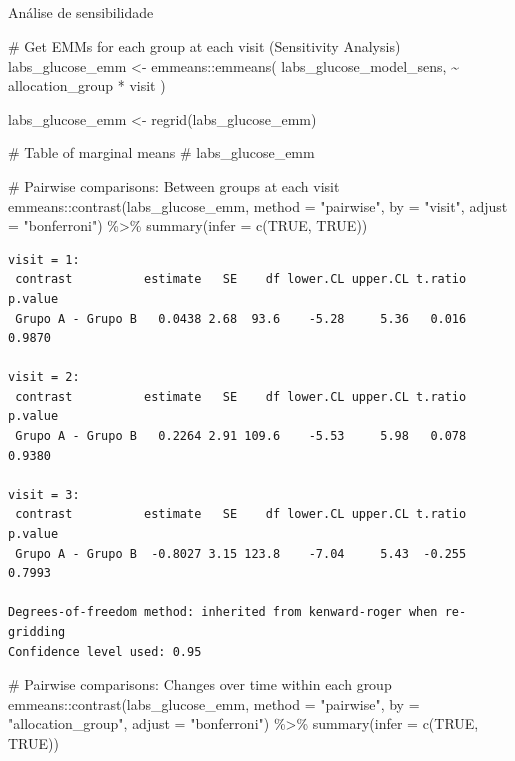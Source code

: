 \documentclass[
  12pt,
]{article}
\makeatletter
\let\oldsubparagraph\subparagraph
\renewcommand{\subparagraph}{
    \@ifstar
      \xxxSubParagraphStar
      \xxxSubParagraphNoStar
  }
\newcommand{\xxxSubParagraphStar}[1]{\oldsubparagraph*{#1}\mbox{}}
\newcommand{\xxxSubParagraphNoStar}[1]{\oldsubparagraph{#1}\mbox{}}
\newenvironment{Shaded}{\begin{snugshade}}{\end{snugshade}}
\newcommand{\AttributeTok}[1]{\textcolor[rgb]{0.40,0.45,0.13}{#1}}
\newcommand{\CommentTok}[1]{\textcolor[rgb]{0.37,0.37,0.37}{#1}}
\newcommand{\ConstantTok}[1]{\textcolor[rgb]{0.56,0.35,0.01}{#1}}
\newcommand{\FunctionTok}[1]{\textcolor[rgb]{0.28,0.35,0.67}{#1}}
\newcommand{\NormalTok}[1]{\textcolor[rgb]{0.00,0.23,0.31}{#1}}
\newcommand{\OtherTok}[1]{\textcolor[rgb]{0.00,0.23,0.31}{#1}}
\newcommand{\SpecialCharTok}[1]{\textcolor[rgb]{0.37,0.37,0.37}{#1}}
\newcommand{\StringTok}[1]{\textcolor[rgb]{0.13,0.47,0.30}{#1}}
\makeatother
\begin{document}
\subparagraph{Análise de
sensibilidade}\label{anuxe1lise-de-sensibilidade-8}

\begin{Shaded}
\begin{Highlighting}[]
\CommentTok{\# Get EMMs for each group at each visit (Sensitivity Analysis)}
\NormalTok{labs\_glucose\_emm }\OtherTok{\textless{}{-}}\NormalTok{ emmeans}\SpecialCharTok{::}\FunctionTok{emmeans}\NormalTok{(}
\NormalTok{    labs\_glucose\_model\_sens, }
    \SpecialCharTok{\textasciitilde{}}\NormalTok{ allocation\_group }\SpecialCharTok{*}\NormalTok{ visit}
\NormalTok{)}

\NormalTok{labs\_glucose\_emm }\OtherTok{\textless{}{-}} \FunctionTok{regrid}\NormalTok{(labs\_glucose\_emm)}

\CommentTok{\# Table of marginal means}
\CommentTok{\# labs\_glucose\_emm}

\CommentTok{\# Pairwise comparisons: Between groups at each visit}
\NormalTok{emmeans}\SpecialCharTok{::}\FunctionTok{contrast}\NormalTok{(labs\_glucose\_emm,}
\AttributeTok{method =} \StringTok{"pairwise"}\NormalTok{, }\AttributeTok{by =} \StringTok{"visit"}\NormalTok{,}
\AttributeTok{adjust =} \StringTok{"bonferroni"}\NormalTok{) }\SpecialCharTok{\%\textgreater{}\%} \FunctionTok{summary}\NormalTok{(}\AttributeTok{infer =} \FunctionTok{c}\NormalTok{(}\ConstantTok{TRUE}\NormalTok{, }\ConstantTok{TRUE}\NormalTok{))}
\end{Highlighting}
\end{Shaded}

\begin{verbatim}
visit = 1:
 contrast          estimate   SE    df lower.CL upper.CL t.ratio p.value
 Grupo A - Grupo B   0.0438 2.68  93.6    -5.28     5.36   0.016  0.9870

visit = 2:
 contrast          estimate   SE    df lower.CL upper.CL t.ratio p.value
 Grupo A - Grupo B   0.2264 2.91 109.6    -5.53     5.98   0.078  0.9380

visit = 3:
 contrast          estimate   SE    df lower.CL upper.CL t.ratio p.value
 Grupo A - Grupo B  -0.8027 3.15 123.8    -7.04     5.43  -0.255  0.7993

Degrees-of-freedom method: inherited from kenward-roger when re-gridding 
Confidence level used: 0.95 
\end{verbatim}

\begin{Shaded}
\begin{Highlighting}[]
\CommentTok{\# Pairwise comparisons: Changes over time within each group}
\NormalTok{emmeans}\SpecialCharTok{::}\FunctionTok{contrast}\NormalTok{(labs\_glucose\_emm,}
\AttributeTok{method =} \StringTok{"pairwise"}\NormalTok{, }\AttributeTok{by =} \StringTok{"allocation\_group"}\NormalTok{,}
\AttributeTok{adjust =} \StringTok{"bonferroni"}\NormalTok{) }\SpecialCharTok{\%\textgreater{}\%} \FunctionTok{summary}\NormalTok{(}\AttributeTok{infer =} \FunctionTok{c}\NormalTok{(}\ConstantTok{TRUE}\NormalTok{, }\ConstantTok{TRUE}\NormalTok{))}
\end{Highlighting}
\end{Shaded}
\end{document}
